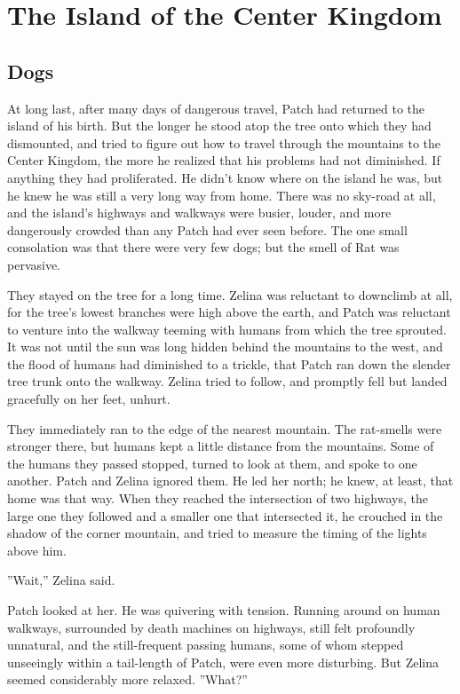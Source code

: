 \documentclass[12pt]{book}
\begin{document}

\chapter{The Island of the Center Kingdom}

\section{Dogs}

At long last, after many days of dangerous travel, Patch had returned to the island of his birth. But the longer he stood atop the tree onto which they had dismounted, and tried to figure out how to travel through the mountains to the Center Kingdom, the more he realized that his problems had not diminished. If anything they had proliferated. He didn't know where on the island he was, but he knew he was still a very long way from home. There was no sky-road at all, and the island's highways and walkways were busier, louder, and more dangerously crowded than any Patch had ever seen before. The one small consolation was that there were very few dogs; but the smell of Rat was pervasive.

They stayed on the tree for a long time. Zelina was reluctant to downclimb at all, for the tree's lowest branches were high above the earth, and Patch was reluctant to venture into the walkway teeming with humans from which the tree sprouted. It was not until the sun was long hidden behind the mountains to the west, and the flood of humans had diminished to a trickle, that Patch ran down the slender tree trunk onto the walkway. Zelina tried to follow, and promptly fell %
but landed gracefully on her feet, unhurt.

They immediately ran to the edge of the nearest mountain. The rat-smells were stronger there, but humans kept a little distance from the mountains. Some of the humans they passed stopped, turned to look at them, and spoke to one another. Patch and Zelina ignored them. He led her north; he knew, at least, that home was that way. When they reached the intersection of two highways, the large one they followed and a smaller one that intersected it, he crouched in the shadow of the corner mountain, and tried to measure the timing of the lights above him.

''Wait,'' Zelina said.

Patch looked at her. He was quivering with tension. Running around on human walkways, surrounded by death machines on highways, still felt profoundly unnatural, and the still-frequent passing humans, some of whom stepped unseeingly within a tail-length of Patch, were even more disturbing. But Zelina seemed considerably more relaxed. ''What?''
\end{document}

